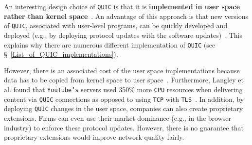 \documentclass[12pt,a4paper]{report}
\begin{document}
  An interesting design choice of \texttt{QUIC} is that it is \textbf{implemented in user space rather than kernel space}~\cite{the-road-to-quic, Implementation_and_Performance_Evaluation_of_the_QUIC_Protocol_in_Linux_Kernel, quic-and-http-3-too-big-to-fail}.
  An advantage of this approach is that new versions of \texttt{QUIC}, associated with user-level programs, can be quickly developed and deployed (e.g., by deploying protocol updates with the software updates)~\cite{the-road-to-quic}.
  This explains why there are numerous different implementation of \texttt{QUIC} (see \S~\ref{List_of_QUIC_implementations}).
 
  
  However, there is an associated cost of the user space implementations because data has to be copied from kernel space to user space~\cite{benchmarking-quic}.
  Furthermore, Langley et al. found that \texttt{YouTube's} servers used 350\% more \texttt{CPU} resources when delivering content via \texttt{QUIC} connections as opposed to using \texttt{TCP} with \texttt{TLS}~\cite{The_QUIC_Transport_Protocol_Design_and_Internet-Scale_Deployment}.
  In addition, by deploying \texttt{QUIC} changes in the user space, companies can also create proprietary extensions.
  Firms can even use their market dominance (e.g., in the browser industry) to enforce these protocol updates.
  However, there is no guarantee that proprietary extensions would improve network quality fairly. 
\end{document}
